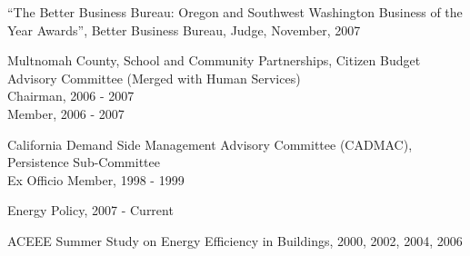 \documentclass[Computer Science]{vita}
\begin{document}
\begin{vita}
\begin{Professional and Service Activities}
\begin{Community}
    \item ``The Better Business Bureau: Oregon and Southwest
      Washington Business of the Year Awards'', Better Business
      Bureau, Judge, November, 2007


    \item Multnomah County, School and Community Partnerships, Citizen Budget Advisory Committee (Merged with Human Services)\\
      Chairman, 2006 - 2007\\
      Member, 2006 - 2007
	
    \item California Demand Side Management Advisory Committee (CADMAC), Persistence Sub-Committee\\
      Ex Officio Member, 1998 - 1999

    \end{Community}
    \begin{Journal Article and Paper Review}

    \item Energy Policy, 2007 - Current
    \item ACEEE Summer Study on Energy Efficiency in Buildings, 2000,
      2002, 2004, 2006
  \end{Journal Article and Paper Review}

  \end{Professional and Service Activities}


% 
% 

\end{vita}
\end{document}
